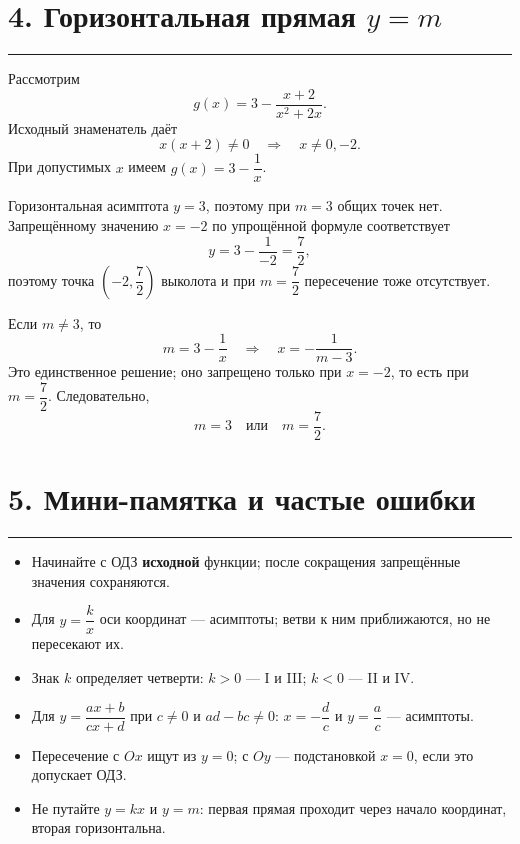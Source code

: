 \documentclass[a4paper,12pt]{article}
\newcommand{\sectionrule}{%
    \vspace{-0.4em}%
    {\color{softgray}\hrule}%
    \vspace{0.7em}%
}
\begin{document}
\clearpage
\restoregeometry


\section*{4. Горизонтальная прямая $y=m$}
\sectionrule

Рассмотрим
\[
g(x)=3-\frac{x+2}{x^2+2x}.
\]
Исходный знаменатель даёт
\[
x(x+2)\ne0
\quad\Longrightarrow\quad
x\ne0,-2.
\]
При допустимых $x$ имеем $g(x)=3-\dfrac1x$.

Горизонтальная асимптота $y=3$, поэтому при $m=3$ общих точек нет.
Запрещённому значению $x=-2$ по упрощённой формуле соответствует
\[
y=3-\frac1{-2}=\frac72,
\]
поэтому точка $\left(-2,\dfrac72\right)$ выколота и при $m=\dfrac72$
пересечение тоже отсутствует.

Если $m\ne3$, то
\[
m=3-\frac1x
\quad\Longrightarrow\quad
x=-\frac1{m-3}.
\]
Это единственное решение; оно запрещено только при $x=-2$, то есть при
$m=\dfrac72$. Следовательно,
\[
\boxed{m=3\quad\text{или}\quad m=\frac72}.
\]

\section*{5. Мини-памятка и частые ошибки}
\sectionrule

\begin{itemize}
    \item Начинайте с ОДЗ \textbf{исходной} функции; после сокращения запрещённые значения сохраняются.
    \item Для $y=\dfrac{k}{x}$ оси координат --- асимптоты; ветви к ним приближаются, но не пересекают их.
    \item Знак $k$ определяет четверти: $k>0$ --- I и III; $k<0$ --- II и IV.
    \item Для $y=\dfrac{ax+b}{cx+d}$ при $c\ne0$ и $ad-bc\ne0$:
    $x=-\dfrac{d}{c}$ и $y=\dfrac{a}{c}$ --- асимптоты.
    \item Пересечение с $Ox$ ищут из $y=0$; с $Oy$ --- подстановкой $x=0$, если это допускает ОДЗ.
    \item Не путайте $y=kx$ и $y=m$: первая прямая проходит через начало координат, вторая горизонтальна.
\end{itemize}

\end{document}

